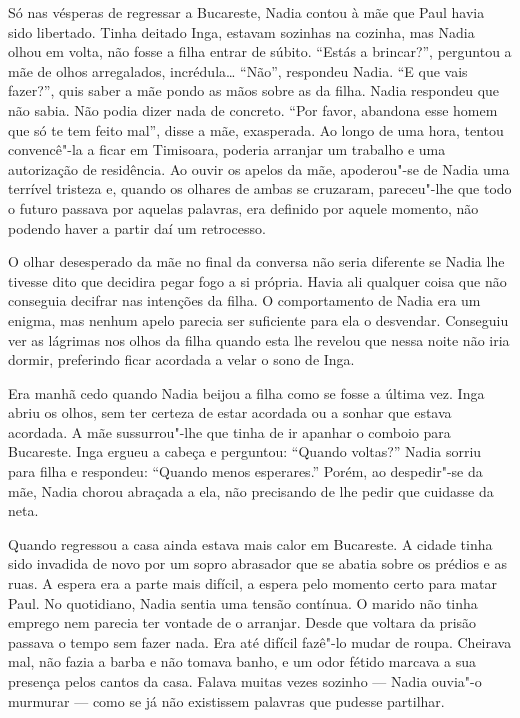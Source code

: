 Só nas vésperas de regressar a Bucareste, Nadia contou à mãe que Paul
havia sido libertado. Tinha deitado Inga, estavam sozinhas na cozinha,
mas Nadia olhou em volta, não fosse a filha entrar de súbito. ``Estás a
brincar?'', perguntou a mãe de olhos arregalados, incrédula\ldots{}
``Não'', respondeu Nadia. ``E que vais fazer?'', quis saber a mãe pondo as
mãos sobre as da filha. Nadia respondeu que não sabia. Não podia dizer
nada de concreto. ``Por favor, abandona esse homem que só te tem feito
mal'', disse a mãe, exasperada. Ao longo de uma hora, tentou convencê"-la
a ficar em Timisoara, poderia arranjar um trabalho e uma autorização de
residência. Ao ouvir os apelos da mãe, apoderou"-se de Nadia uma terrível
tristeza e, quando os olhares de ambas se cruzaram, pareceu"-lhe que todo
o futuro passava por aquelas palavras, era definido por aquele momento,
não podendo haver a partir daí um retrocesso.

O olhar desesperado da mãe no final da conversa não
seria diferente se Nadia lhe tivesse dito que decidira pegar
fogo a si própria. Havia ali qualquer coisa que não conseguia decifrar
nas intenções da filha. O comportamento de Nadia era um enigma, mas
nenhum apelo parecia ser suficiente para ela o desvendar. Conseguiu ver
as lágrimas nos olhos da filha quando esta lhe revelou que nessa noite
não iria dormir, preferindo ficar acordada a velar o sono de Inga.

Era manhã cedo quando Nadia beijou a filha como se fosse a última vez.
Inga abriu os olhos, sem ter certeza de estar acordada ou a sonhar que
estava acordada. A mãe sussurrou"-lhe que tinha de ir apanhar o comboio
para Bucareste. Inga ergueu a cabeça e perguntou: ``Quando voltas?'' Nadia
sorriu para filha e respondeu: ``Quando menos esperares.'' Porém, ao
despedir"-se da mãe, Nadia chorou abraçada a ela, não precisando de lhe
pedir que cuidasse da neta.

Quando regressou a casa ainda estava mais calor em Bucareste. A cidade
tinha sido invadida de novo por um sopro abrasador que se abatia sobre
os prédios e as ruas. A espera era a parte mais difícil, a espera pelo
momento certo para matar Paul. No quotidiano, Nadia sentia uma tensão
contínua. O marido não tinha emprego nem parecia ter vontade de o
arranjar. Desde que voltara da prisão passava o tempo sem fazer nada.
Era até difícil fazê"-lo mudar de roupa. Cheirava mal, não fazia a barba
e não tomava banho, e um odor fétido marcava a sua presença pelos cantos
da casa. Falava muitas vezes sozinho --- Nadia ouvia"-o murmurar --- como
se já não existissem palavras que pudesse partilhar.

